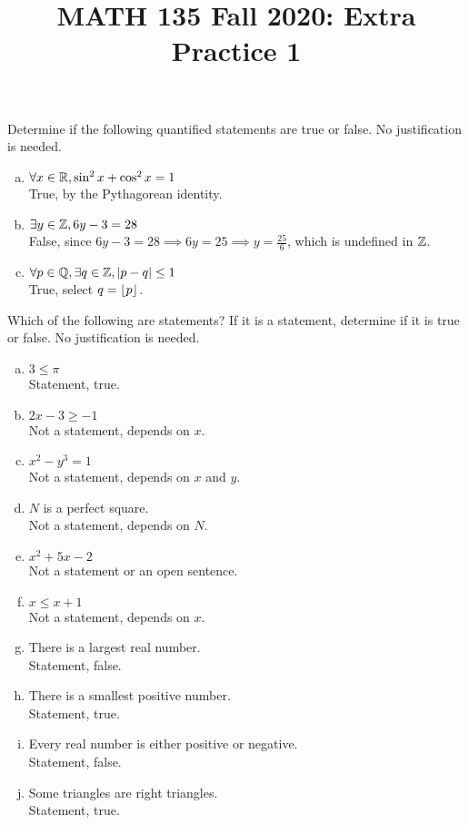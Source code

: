 
\title{MATH 135 Fall 2020: Extra Practice 1}


\thispagestyle{firstpage}

\textbf{\@title}


\question Determine if the following quantified statements are true or false.
No justification is needed.
\begin{enumerate}[(a)]
  \item $\forall x\in\mathbb{R}, \sin^2x+\cos^2x=1$ \\
        True, by the Pythagorean identity.
  \item $\exists y\in\mathbb{Z}, 6y-3=28$ \\
        False, since $6y-3=28 \implies 6y=25 \implies y=\frac{25}{6}$, which is undefined in $\mathbb{Z}$.
  \item $\forall p\in\mathbb{Q}, \exists q\in\mathbb{Z}, |p-q| \leq 1$ \\
        True, select $q = \lfloor p\rfloor$.
\end{enumerate}



\question Which of the following are statements?
If it is a statement, determine if it is true or false.
No justification is needed.
\begin{enumerate}[(a)]
  \item $3 \leq \pi$ \\
        Statement, true.
  \item $2x-3 \geq -1$ \\
        Not a statement, depends on $x$.
  \item $x^2-y^3 = 1$ \\
        Not a statement, depends on $x$ and $y$.
  \item $N$ is a perfect square. \\
        Not a statement, depends on $N$.
  \item $x^2+5x-2$ \\
        Not a statement or an open sentence.
  \item $x \leq x+1$ \\
        Not a statement, depends on $x$.
  \item There is a largest real number. \\
        Statement, false.
  \item There is a smallest positive number. \\
        Statement, true.
  \item Every real number is either positive or negative. \\
        Statement, false.
  \item Some triangles are right triangles. \\
        Statement, true.
\end{enumerate}


